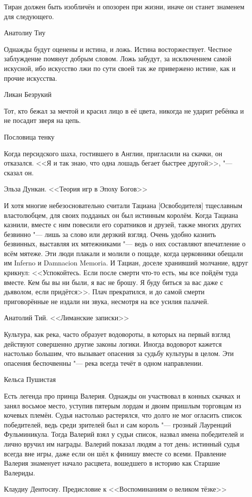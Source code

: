 \epigraph
{Тиран должен быть изобличён и опозорен при жизни, иначе он станет знаменем для следующего.}
{Анатолиу Тиу}

\epigraph
{Однажды будут оценены и истина, и ложь.
Истина восторжествует.
Честное заблуждение помянут добрым словом.
Ложь забудут, за исключением самой искусной, ибо искусство лжи по сути своей так же привержено истине, как и прочие искусства.}
{Ликан Безрукий}

\epigraph
{Тот, кто бежал за мечтой и красил лицо в её цвета, никогда не ударит ребёнка и не посадит зверя на цепь.}
{Пословица тенку}

\epigraph
{Когда персидского шаха, гостившего в Англии, пригласили на скачки, он отказался.
<<Я и так знаю, что одна лошадь бегает быстрее другой>>, "--- сказал он.}
{Эльза Дункан.
<<Теория игр в Эпоху Богов>>}

\epigraph
{\ldotst И хотя многие небезосновательно считали Тациана [Освободителя] тщеславным властолюбцем, для своих подданых он был истинным королём.
Когда Тациана казнили, вместе с ним повесили его соратников и друзей, также многих других безвинно "--- лишь за слово или дерзкий взгляд.
Очень удобно казнить безвинных, выставляя их мятежниками "--- ведь о них составляют впечатление о всём мятеже.
Эти люди плакали и молили о пощаде, когда церковники обещали им Inferno\footnotemark{} и Damnacion Memoria\footnotemark.
И Тациан, доселе хранивший молчание, вдруг крикнул: <<Успокойтесь.
Если после смерти что-то есть, мы все пойдём туда вместе.
Кем бы вы ни были, я вас не брошу.
Я буду биться за вас даже с дьяволом, если придётся>>.
Плач прекратился, и до самой смерти приговорённые не издали ни звука, несмотря на все усилия палачей.}
{Анатолий Тий.
<<Лиманские записки>>}

\epigraph
{Культура, как река, часто образует водовороты, в которых на первый взгляд действуют совершенно другие законы логики.
Иногда водоворот кажется настолько большим, что вызывает опасения за судьбу культуры в целом.
Эти опасения беспочвенны "--- река всегда течёт в одном направлении.}
{Кельса Пушистая}

\epigraph
{Есть легенда про принца Валерия.
Однажды он участвовал в конных скачках и занял восьмое место, уступив пятерым лордам и двоим пришлым торговцам из кочевых племён.
Судья настолько растерялся, что долго не мог огласить список победителей, ведь среди зрителей был и сам король "--- грозный Лауренций Фульминикула.
Тогда Валерий взял у судьи список, назвал имена победителей и лично вручил им награды.
Валерий показал людям а тот день: истинный судья всегда вне игры, даже если он шёл к финишу вместе со всеми.
Правление Валерия знаменует начало расцвета, вошедшего в историю как Старшие Валериды.}
{Клаудиу Дентосиу.
Предисловие к <<Воспоминаниям о великом тёзке>>}

